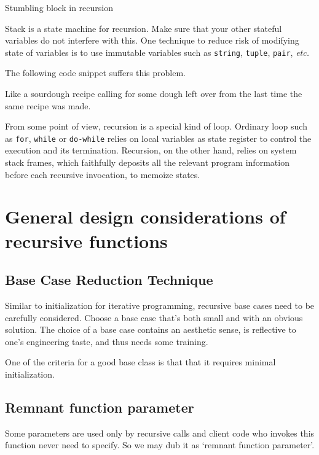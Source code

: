 \documentclass[oneside,11pt]{book}
\theoremstyle{definition}
\theoremstyle{remark}
\newcommand{\code}[1]{\mbox{\lstinline{#1}}}
\begin{document}
Stumbling block in recursion

Stack is a state machine for recursion.
Make sure that your other stateful variables do not interfere with this.
One technique to reduce risk of modifying state of variables is to use immutable variables such
as \code{string}, \code{tuple}, \code{pair}, \textit{etc.}

The following code snippet suffers this problem.


Like a sourdough recipe calling for some dough left over from the last time the same recipe was
made.

From some point of view, recursion is a special kind of loop.
Ordinary loop such as \code{for}, \code{while} or \code{do-while} relies on local variables as
state register to control the execution and its termination.
Recursion, on the other hand, relies on system stack frames, which faithfully
deposits all the relevant program information before each recursive invocation,
to memoize states.


\section{General design considerations of recursive functions}\label{sec:generalRecursiveFunction}

\subsection{Base Case Reduction Technique}\label{subsec:baseCaseShrinkingTechnique}

Similar to initialization for iterative programming, recursive base cases need to be carefully
considered.
Choose a base case that's both small and with an obvious solution.
The choice of a base case contains an aesthetic sense, is reflective to one's
engineering taste, and thus needs some training.

One of the criteria for a good base class is that that it requires minimal initialization.

\subsection{Remnant function parameter}\label{sec:remnantFunctionParameter}

Some parameters are used only by recursive calls and
client code who invokes this function never need to specify.
So we may dub it as `remnant function parameter'.
\end{document}
